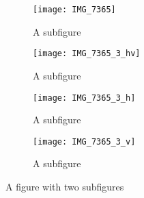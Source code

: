 \documentclass[12pt]{IIBproject}
\begin{document}
\begin{figure}[H]
\centering
\begin{subfigure}{.45\textwidth}
  \centering
  \texttt{[image: IMG\_7365]}
  \caption{A subfigure}
  \label{fig:sub1}
\end{subfigure}%
\begin{subfigure}{.45\textwidth}
  \centering
  \texttt{[image: IMG\_7365\_3\_hv]}
  \caption{A subfigure}
  \label{fig:sub2}
\end{subfigure}
\begin{subfigure}{.45\textwidth}
  \centering
  \texttt{[image: IMG\_7365\_3\_h]}
  \caption{A subfigure}
  \label{fig:sub2}
\end{subfigure}
\begin{subfigure}{.45\textwidth}
  \centering
  \texttt{[image: IMG\_7365\_3\_v]}
  \caption{A subfigure}
  \label{fig:sub2}
\end{subfigure}
\caption{A figure with two subfigures}
\label{fig:test}
\end{figure}
\end{document}
